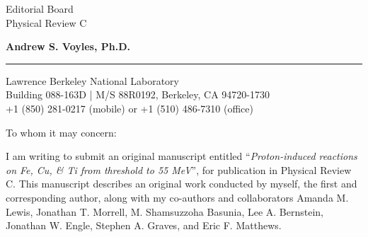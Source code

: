 \documentclass{letter} %
\begin{document}
\signature{Andrew S. Voyles}           %
\longindentation=0pt                       %
\let\raggedleft\raggedright                %
 
 
\begin{letter}{
Editorial Board \\
Physical Review C}


\begin{flushleft}
{\large\bf Andrew S. Voyles, Ph.D.}
\end{flushleft}
\medskip\hrule height 1pt
\begin{flushright}
\hfill Lawrence Berkeley National Laboratory \\
\hfill Building 088-163D  |  M/S 88R0192, Berkeley, CA  94720-1730 \\
\hfill  +1 (850) 281-0217 (mobile) or +1 (510) 486-7310 (office) 
\end{flushright} 
\vfill %

 
\opening{To whom it may concern:} 

  \renewcommand*{\thefootnote}{\alph{footnote}}


  
\noindent I am writing to submit an original manuscript entitled \enquote{\emph{Proton-induced reactions on Fe, Cu, \& Ti from threshold to 55 MeV}},  for publication in Physical Review C. 
This manuscript describes an original work conducted by myself, the first and corresponding author, along with my co-authors and collaborators Amanda M. Lewis\footnotemark[1], Jonathan T. Morrell\footnotemark[1], M. Shamsuzzoha Basunia\footnotemark[2], Lee A. Bernstein\footnotemark[1]\footnotemark[2], 
Jonathan W. Engle\footnotemark[3], Stephen A. Graves\footnotemark[4], and Eric F. Matthews\footnotemark[1].



\end{letter}
\end{document}
